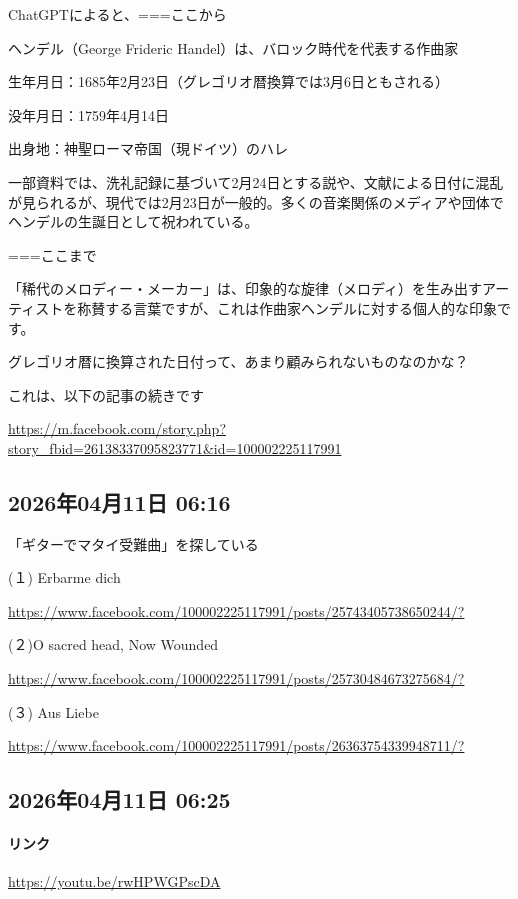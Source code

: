 ChatGPTによると、===ここから

ヘンデル（George Frideric Handel）は、バロック時代を代表する作曲家

生年月日：1685年2月23日（グレゴリオ暦換算では3月6日ともされる）

没年月日：1759年4月14日

出身地：神聖ローマ帝国（現ドイツ）のハレ

一部資料では、洗礼記録に基づいて2月24日とする説や、文献による日付に混乱が見られるが、現代では2月23日が一般的。多くの音楽関係のメディアや団体でヘンデルの生誕日として祝われている。

===ここまで

「稀代のメロディー・メーカー」は、印象的な旋律（メロディ）を生み出すアーティストを称賛する言葉ですが、これは作曲家ヘンデルに対する個人的な印象です。

グレゴリオ暦に換算された日付って、あまり顧みられないものなのかな？

これは、以下の記事の続きです

\url{https://m.facebook.com/story.php?story_fbid=26138337095823771&id=100002225117991}

\subsection*{2026年04月11日 06:16}

「ギターでマタイ受難曲」を探している

(１) Erbarme dich

\url{https://www.facebook.com/100002225117991/posts/25743405738650244/?}

(２)O sacred head, Now Wounded

\url{https://www.facebook.com/100002225117991/posts/25730484673275684/?}

(３) Aus Liebe

\url{https://www.facebook.com/100002225117991/posts/26363754339948711/?}

\subsection*{2026年04月11日 06:25}

\paragraph{リンク}
\url{https://youtu.be/rwHPWGPscDA}

